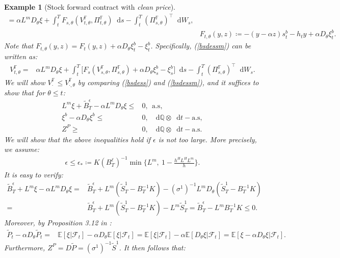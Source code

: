 \documentclass[a4paper, 11pt]{article}              %
\numberwithin{equation}{section}
\theoremstyle{plain}
\newcommand{\dqdt}{\df \dsQ \otimes \df t-\text{a.s}}
\newcommand{\1}{\mathds{1}}
\newcommand{\calF}{\mathcal{F}}
\newcommand{\Bt}{\tilde{B}}
\newcommand{\St}{\tilde{S}}
\newcommand{\pt}{\tilde{P}}
\newcommand{\dsE}{\mathbb{E}}
\newcommand{\dsF}{\mathbb{F}}
\newcommand{\dsQ}{\mathbb{Q}}
\theoremstyle{plain}
\theoremstyle{definition}
\newtheorem{example}[thm]{Example}
\theoremstyle{plain}
\newtheorem{example}{Example}
\newcommand*\df{\mathop{}\!\mathrm{d}}
\begin{document}
\begin{example}[Stock forward contract with \textit{clean price}]
\begin{align}
  =\alpha L^mD_\theta\xi + \int_{t}^{T}F_{s, \theta}( V^\dsF_{t, \theta},  \Pi^\dsF_{t, \theta})\df s
                     -\int_{t}^{T}(\Pi^\dsF_{s, \theta})^\top\df W_s, \label{bsdessm}\\
  &F_{t, \theta}(y, z)\coloneqq-(y -\alpha z)s_t^{b}-h_ty +\alpha D_{\theta}\xi^b_t.
\end{align}
Note that $F_{t, \theta}(y, z) = F_{t}(y, z) +\alpha D_{\theta}\xi^b_t-\xi^b_t $. Specifically,
(\ref{bsdessm}) can be written as:
\begin{align}
  V^\dsF_{t, \theta}
  =&\alpha L^mD_\theta\xi + \int_{t}^{T}\Big[F_{s}
     ( V^\dsF_{s, \theta},  \Pi^\dsF_{s, \theta})+\alpha
     D_{\theta}\xi^b_s-\xi^b_s\big]\df s 
                     -\int_{t}^{T}(\Pi^\dsF_{s, \theta})^\top\df W_s. \label{bsdessm2}  
\end{align}
We will show  $V^\dsF_{\cdot} \leq V^\dsF_{\cdot , \theta} $ by comparing (\ref{bsdess}) and
(\ref{bsdessm}), and it suffices to show that for $\theta \leq
t$:
\begin{align}
  L^m\xi+\Bt^\epsilon_T-\alpha L^mD_{\theta}\xi \leq&0, ~~\text{a.s, }\label{ex.idea.ineq1}\\
  \xi^b -\alpha D_{\theta}\xi^b \leq& 0, ~~ \dqdt,\label{ex.idea.ineq2}\\
  Z^P \geq& 0, ~~ \dqdt.
\end{align}
We will show that the above inequalities hold if $\epsilon$ is not too large. More
precisely, we assume:
\begin{align}
  \epsilon \leq \epsilon_*\coloneqq K (B^\ell_T)^{-1}\min\Big\{L^m , ~ 1-\frac{h^HL^HL^m}{h}\Big\}. \label{ex.idea.eus}
\end{align}
It is easy to verify:
\begin{align}
  \Bt^\epsilon_T+L^m\xi-\alpha L^m D_{\theta}\xi =
  &\Bt^\epsilon_T+ L^m(\St^1_T - B^{-1}_TK)-(\sigma^1)^{-1}L^m D_{\theta}(\St^1_T - B_T^{-1}K)
                                   \nonumber \\
  =&\Bt^\epsilon_T+L^m(\St^1_T - B_T^{-1}K) - L^m\St^1_T=\Bt^\epsilon_T- L^mB_T^{-1}K\leq0. \nonumber 
\end{align}
Moreover, by Proposition 3.12 in \cite{di2009malliavin}:
\begin{align}
  \pt_t -\alpha D_{\theta}\pt_t
  =&\dsE[\xi|\calF_t]-\alpha D_{\theta}\dsE[\xi|\calF_t]
     =\dsE[\xi|\calF_t]-\alpha\dsE[ D_{\theta}\xi|\calF_t] =\dsE[\xi-\alpha D_{\theta}\xi|\calF_t].\nonumber 
\end{align}
Furthermore, $Z^P = D\pt = (\sigma^1)^{-1}\St^1$. It then follows that:

\end{example}
\end{document}
